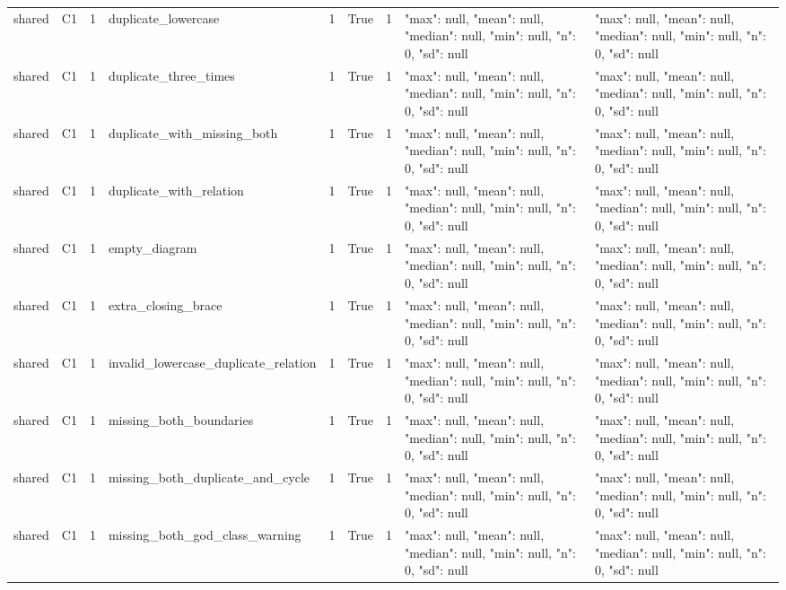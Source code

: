 \begin{tabular}{lllllllll}
shared & C1 & 1 & duplicate\_lowercase & 1 & True & 1 & {"max": null, "mean": null, "median": null, "min": null, "n": 0, "sd": null} & {"max": null, "mean": null, "median": null, "min": null, "n": 0, "sd": null} \\
shared & C1 & 1 & duplicate\_three\_times & 1 & True & 1 & {"max": null, "mean": null, "median": null, "min": null, "n": 0, "sd": null} & {"max": null, "mean": null, "median": null, "min": null, "n": 0, "sd": null} \\
shared & C1 & 1 & duplicate\_with\_missing\_both & 1 & True & 1 & {"max": null, "mean": null, "median": null, "min": null, "n": 0, "sd": null} & {"max": null, "mean": null, "median": null, "min": null, "n": 0, "sd": null} \\
shared & C1 & 1 & duplicate\_with\_relation & 1 & True & 1 & {"max": null, "mean": null, "median": null, "min": null, "n": 0, "sd": null} & {"max": null, "mean": null, "median": null, "min": null, "n": 0, "sd": null} \\
shared & C1 & 1 & empty\_diagram & 1 & True & 1 & {"max": null, "mean": null, "median": null, "min": null, "n": 0, "sd": null} & {"max": null, "mean": null, "median": null, "min": null, "n": 0, "sd": null} \\
shared & C1 & 1 & extra\_closing\_brace & 1 & True & 1 & {"max": null, "mean": null, "median": null, "min": null, "n": 0, "sd": null} & {"max": null, "mean": null, "median": null, "min": null, "n": 0, "sd": null} \\
shared & C1 & 1 & invalid\_lowercase\_duplicate\_relation & 1 & True & 1 & {"max": null, "mean": null, "median": null, "min": null, "n": 0, "sd": null} & {"max": null, "mean": null, "median": null, "min": null, "n": 0, "sd": null} \\
shared & C1 & 1 & missing\_both\_boundaries & 1 & True & 1 & {"max": null, "mean": null, "median": null, "min": null, "n": 0, "sd": null} & {"max": null, "mean": null, "median": null, "min": null, "n": 0, "sd": null} \\
shared & C1 & 1 & missing\_both\_duplicate\_and\_cycle & 1 & True & 1 & {"max": null, "mean": null, "median": null, "min": null, "n": 0, "sd": null} & {"max": null, "mean": null, "median": null, "min": null, "n": 0, "sd": null} \\
shared & C1 & 1 & missing\_both\_god\_class\_warning & 1 & True & 1 & {"max": null, "mean": null, "median": null, "min": null, "n": 0, "sd": null} & {"max": null, "mean": null, "median": null, "min": null, "n": 0, "sd": null} \\

\end{tabular}
